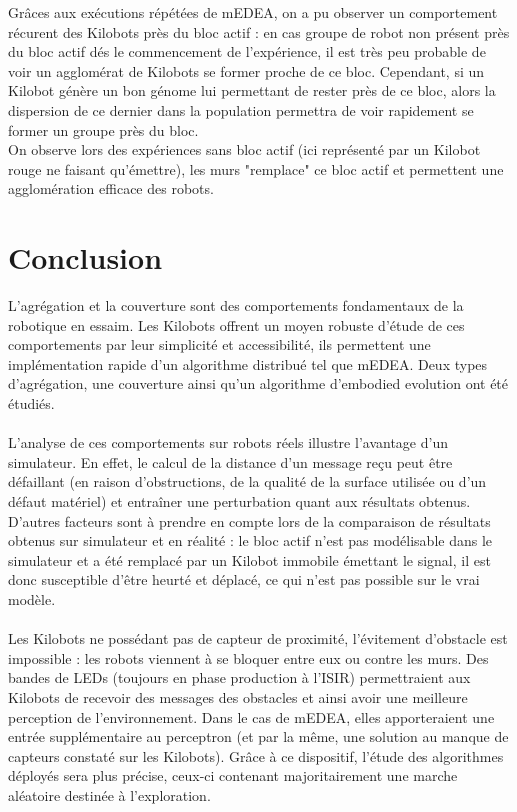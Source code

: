 \documentclass[a4paper]{article}
\begin{document}
Grâces aux exécutions répétées de mEDEA, on a pu observer un comportement récurent des Kilobots près du bloc actif : en cas groupe de robot non présent près du bloc actif dés le commencement de l'expérience, il est très peu probable de voir un agglomérat de Kilobots se former proche de ce bloc. Cependant, si un Kilobot génère un bon génome lui permettant de rester près de ce bloc, alors la dispersion de ce dernier dans la population permettra de voir rapidement se former un groupe près du bloc.\\
On observe lors des expériences sans bloc actif (ici représenté par un Kilobot rouge ne faisant qu'émettre), les murs "remplace" ce bloc actif et permettent une agglomération efficace des robots.
\newpage
\section{Conclusion}
L’agrégation et la couverture sont des comportements fondamentaux de la robotique en essaim. Les Kilobots offrent un moyen robuste d’étude de ces comportements par leur simplicité et accessibilité, ils permettent une implémentation rapide d’un algorithme distribué tel que mEDEA. Deux types d’agrégation, une couverture ainsi qu’un algorithme d’embodied evolution ont été étudiés.
\\ \\
L’analyse de ces comportements sur robots réels illustre l’avantage d’un simulateur. En effet, le calcul de la distance d’un message reçu peut être défaillant (en raison d’obstructions, de la qualité de la surface utilisée ou d’un défaut matériel) et entraîner une perturbation quant aux résultats obtenus. D’autres facteurs sont à prendre en compte lors de la comparaison de résultats obtenus sur simulateur et en réalité : le bloc actif n’est pas modélisable dans le simulateur et a été remplacé par un Kilobot immobile émettant le signal, il est donc susceptible d’être heurté et déplacé, ce qui n’est pas possible sur le vrai modèle.
\\ \\
Les Kilobots ne possédant pas de capteur de proximité, l’évitement d’obstacle est impossible : les robots viennent à se bloquer entre eux ou contre les murs. Des bandes de LEDs (toujours en phase production à l’ISIR) permettraient aux Kilobots de recevoir des messages des obstacles et ainsi avoir une meilleure perception de l’environnement. Dans le cas de mEDEA, elles apporteraient une entrée supplémentaire au perceptron (et par la même, une solution au manque de capteurs constaté sur les Kilobots). Grâce à ce dispositif, l’étude des algorithmes déployés sera plus précise, ceux-ci contenant majoritairement une marche aléatoire destinée à l’exploration. 
\end{document}
